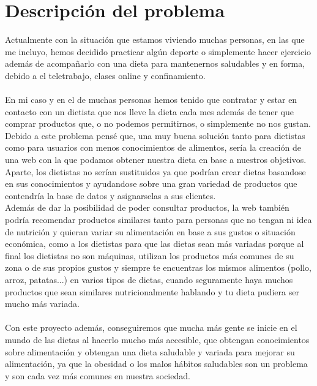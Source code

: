\chapter{Descripción del problema}

Actualmente con la situación que estamos viviendo muchas personas, en las que me incluyo, hemos 
decidido practicar algún deporte o simplemente hacer ejercicio además de acompañarlo con una dieta 
para mantenernos saludables y en forma, debido a el teletrabajo, clases online y confinamiento.
\\\\
En mi caso y en el de muchas personas hemos tenido que contratar y estar en contacto con un dietista que nos lleve la dieta 
cada mes además de tener que comprar productos que, o no podemos permitirnos, o simplemente no nos gustan.\\

Debido a este problema pensé que, una muy buena solución tanto para dietistas como para usuarios con menos conocimientos de 
alimentos, sería la creación de una web con la que podamos obtener nuestra dieta en base a nuestros objetivos. Aparte, los 
dietistas no serían sustituidos ya que podrían crear dietas basandose en sus conocimientos y ayudandose sobre una gran variedad 
de productos que contendría la base de datos y asignarselas a sus clientes.\\

Además de dar la posibilidad de poder consultar productos, la web también podría recomendar productos similares tanto para personas que no 
tengan ni idea de nutrición y quieran variar su alimentación en base a sus gustos o situación económica, como a los dietistas para que 
las dietas sean más variadas porque al final los dietistas no son máquinas, utilizan los productos más comunes de su zona o de sus propios gustos
y siempre te encuentras los mismos alimentos (pollo, arroz, patatas...) en varios tipos de dietas, cuando seguramente haya muchos productos que
sean similares nutricionalmente hablando y tu dieta pudiera ser mucho más variada.
\\\\
Con este proyecto además, conseguiremos que mucha más gente se inicie en el mundo de las dietas al hacerlo mucho 
más accesible, que obtengan conocimientos sobre alimentación y obtengan una dieta saludable y variada para mejorar su alimentación,
ya que la obesidad o los malos hábitos saludables son un problema y son cada vez más comunes en nuestra sociedad.
